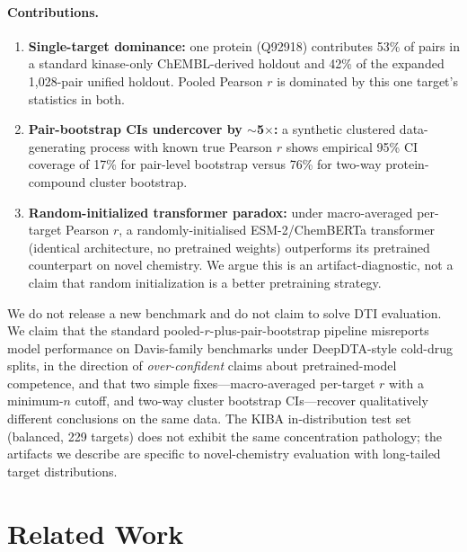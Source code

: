 \documentclass[11pt,a4paper]{article}
\begin{document}
\paragraph{Contributions.}
\begin{enumerate}
  \item \textbf{Single-target dominance:} one protein (Q92918) contributes 53\%
    of pairs in a standard kinase-only ChEMBL-derived holdout and 42\% of the
    expanded 1{,}028-pair unified holdout. Pooled Pearson $r$ is dominated by
    this one target's statistics in both.
  \item \textbf{Pair-bootstrap CIs undercover by $\sim$5$\times$:} a synthetic
    clustered data-generating process with known true Pearson $r$ shows
    empirical 95\% CI coverage of 17\% for pair-level bootstrap versus 76\% for
    two-way protein-compound cluster bootstrap.
  \item \textbf{Random-initialized transformer paradox:} under macro-averaged
    per-target Pearson $r$, a randomly-initialised ESM-2/ChemBERTa transformer
    (identical architecture, no pretrained weights) outperforms its pretrained
    counterpart on novel chemistry. We argue this is an artifact-diagnostic, not
    a claim that random initialization is a better pretraining strategy.
\end{enumerate}

We do not release a new benchmark and do not claim to solve DTI evaluation.
We claim that the standard pooled-$r$-plus-pair-bootstrap pipeline
misreports model performance on Davis-family benchmarks under DeepDTA-style
cold-drug splits, in the direction of \emph{over-confident} claims about
pretrained-model competence, and that two simple fixes---macro-averaged
per-target $r$ with a minimum-$n$ cutoff, and two-way cluster bootstrap
CIs---recover qualitatively different conclusions on the same data.
The KIBA in-distribution test set (balanced, 229 targets) does not exhibit
the same concentration pathology; the artifacts we describe are specific to
novel-chemistry evaluation with long-tailed target distributions.

\section{Related Work}
\end{document}
